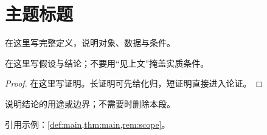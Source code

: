 \documentclass[11pt,a4paper,fontset=fandol,scheme=plain]{ctexart}
\begin{document}
\section{主题标题}
\begin{definition}[概念名称]\label{def:main}
在这里写完整定义，说明对象、数据与条件。
\end{definition}
\begin{theorem}[结果名称]\label{thm:main}
在这里写假设与结论；不要用“见上文”掩盖实质条件。
\end{theorem}
\begin{proof}
在这里写证明。长证明可先给化归，短证明直接进入论证。
\end{proof}
\begin{remark}\label{rem:scope}
说明结论的用途或边界；不需要时删除本段。
\end{remark}
引用示例：\cref{def:main,thm:main,rem:scope}。
\end{document}
